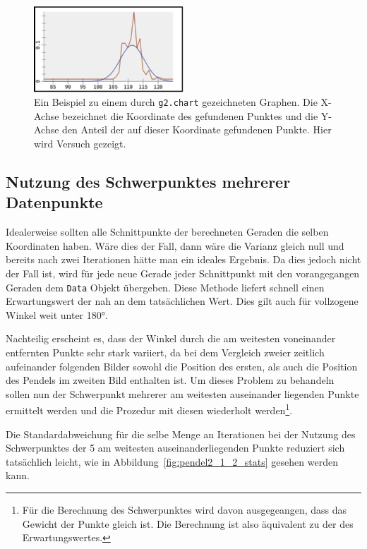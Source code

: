 \begin{figure}
    \centering
    \includegraphics[width=0.5\textwidth]{gfx/normalverteilung.png}
    \caption[Beispiel für in etwa normal verteilte Daten.]{Ein Beispiel zu einem durch \lstinline{g2.chart} gezeichneten Graphen. Die X-Achse bezeichnet die Koordinate des gefundenen Punktes und die Y-Achse den Anteil der auf dieser Koordinate gefundenen Punkte. Hier wird Versuch  gezeigt.}
    \label{fig:normalverteilung}
\end{figure}

\subsection{Nutzung des Schwerpunktes mehrerer Datenpunkte}\label{ch:nutzung_des_schwerpunktes}

Idealerweise sollten alle Schnittpunkte der berechneten Geraden die selben Koordinaten haben.
Wäre dies der Fall, dann wäre die Varianz gleich null und bereits nach zwei Iterationen hätte man ein ideales Ergebnis.
Da dies jedoch nicht der Fall ist, wird für jede neue Gerade jeder Schnittpunkt mit den vorangegangen Geraden dem \lstinline{Data} Objekt übergeben.
Diese Methode liefert schnell einen Erwartungswert der nah an dem tatsächlichen Wert.
Dies gilt auch für vollzogene Winkel weit unter 180°.

Nachteilig erscheint es, dass der Winkel durch die am weitesten voneinander entfernten Punkte sehr stark variiert, da bei dem Vergleich zweier zeitlich aufeinander folgenden Bilder sowohl die Position des ersten, als auch die Position des Pendels im zweiten Bild enthalten ist.
Um dieses Problem zu behandeln sollen nun der Schwerpunkt mehrerer am weitesten auseinander liegenden Punkte ermittelt werden und die Prozedur mit diesen wiederholt werden\footnote{Für die Berechnung des Schwerpunktes wird davon ausgegeangen, dass das Gewicht der Punkte gleich ist. Die Berechnung ist also äquivalent zu der des Erwartungswertes.}.

Die Standardabweichung für die selbe Menge an Iterationen bei der Nutzung des Schwerpunktes der 5 am weitesten auseinanderliegenden Punkte reduziert sich tatsächlich leicht, wie in Abbildung~\ref{fig:pendel2_1_2_stats} gesehen werden kann.

